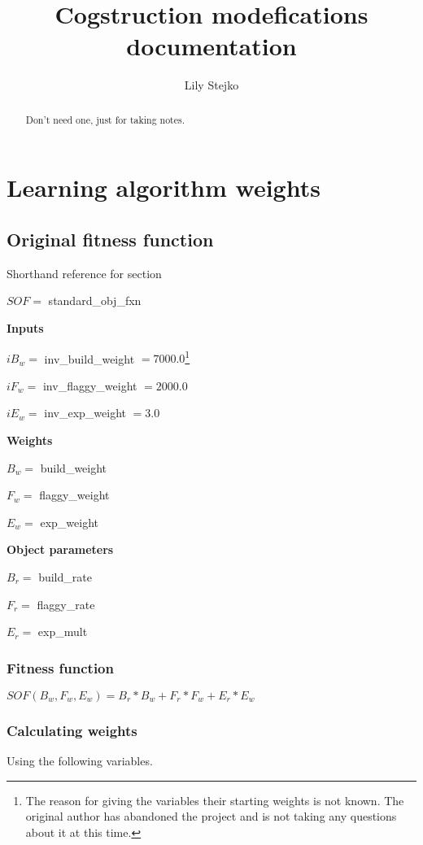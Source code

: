 \documentclass[12pt, letterpaper]{article}
\title{Cogstruction modefications documentation}
\author{Lily Stejko}
\begin{document}
\maketitle

\begin{abstract}
Don't need one, just for taking notes.
\end{abstract}

\section{Learning algorithm weights}

\subsection{Original fitness function}

Shorthand reference for section

$SOF =$ standard\_obj\_fxn

\textbf{Inputs}  

$iB_w =$ inv\_build\_weight $= 7000.0$\footnote[1]{The reason for giving the variables their starting weights is not known. The original author has abandoned the project and is not taking any questions about it at this time.}

$iF_w =$ inv\_flaggy\_weight $= 2000.0$\footnotemark[1]

$iE_w =$ inv\_exp\_weight $= 3.0$\footnotemark[1]

\textbf{Weights}

$B_w =$ build\_weight

$F_w =$ flaggy\_weight

$E_w =$ exp\_weight

\textbf{Object parameters}

$B_r =$ build\_rate

$F_r =$ flaggy\_rate

$E_r =$ exp\_mult

\subsubsection{Fitness function}

$SOF(B_w,F_w,E_w) = B_r*B_w+F_r*F_w+E_r*E_w$

\subsubsection{Calculating weights}

Using the following variables.
\end{document}
